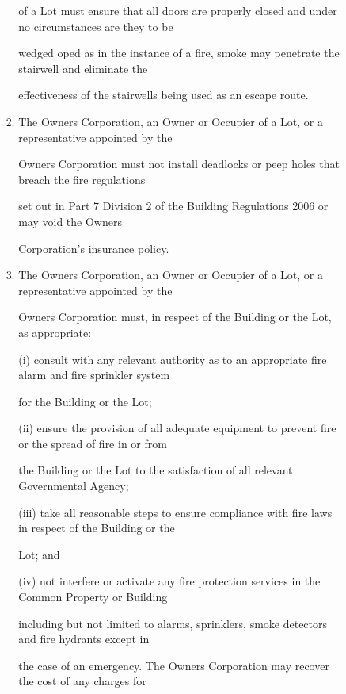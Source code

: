 \documentclass{article}
\begin{document}
\begin{enumerate}[label=\arabic*.]
\begin{enumerate}[label=\arabic{enumi}.\arabic*.]
\begin{enumerate}[label=(\arabic*)]
\begin{enumerate}[label=(\alph*)]
{\fontsize{10.02}{1}of a Lot must ensure that all doors are properly closed and under no circumstances are they to be }

{\fontsize{10.02}{1}wedged oped as in the instance of a fire, smoke may penetrate the stairwell and eliminate the }

{\fontsize{10.02}{1}effectiveness of the stairwells being used as an escape route. }

\item {\fontsize{9.962}{1} The Owners Corporation, an Owner or Occupier of a Lot, or a representative appointed by the }

{\fontsize{10.02}{1}Owners Corporation must not install deadlocks or peep holes that breach the fire regulations }

{\fontsize{10.02}{1}set out in Part 7 Division 2 of the Building Regulations 2006 or may void the Owners }

{\fontsize{10.02}{1}Corporation’s insurance policy. }

\item {\fontsize{9.962}{1} The Owners Corporation, an Owner or Occupier of a Lot, or a representative appointed by the }

{\fontsize{10.02}{1}Owners Corporation must, in respect of the Building or the Lot, as appropriate: }

{\fontsize{9.962}{1}(i) consult with any relevant authority as to an appropriate fire alarm and fire sprinkler system }

{\fontsize{10.02}{1}for the Building or the Lot; }

{\fontsize{9.962}{1}(ii) ensure the provision of all adequate equipment to prevent fire or the spread of fire in or from }

{\fontsize{10.02}{1}the Building or the Lot to the satisfaction of all relevant Governmental Agency; }

{\fontsize{9.962}{1}(iii) take all reasonable steps to ensure compliance with fire laws in respect of the Building or the }

{\fontsize{10.02}{1}Lot; and }

{\fontsize{9.962}{1}(iv) not interfere or activate any fire protection services in the Common Property or Building }

{\fontsize{10.02}{1}including but not limited to alarms, sprinklers, smoke detectors and fire hydrants except in }

{\fontsize{10.02}{1}the case of an emergency. The Owners Corporation may recover the cost of any charges for }


\end{enumerate}
\end{enumerate}
\end{enumerate}
\end{enumerate}
\end{document}
